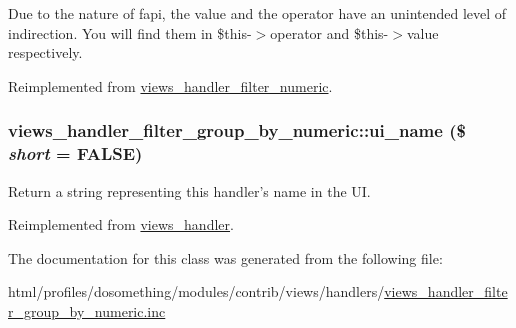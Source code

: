 Due to the nature of fapi, the value and the operator have an unintended level of indirection. You will find them in \$this-\/$>$operator and \$this-\/$>$value respectively. 

Reimplemented from \hyperlink{classviews__handler__filter__numeric_aaa5c6b227651bd1676850f5999f2a897}{views\_\-handler\_\-filter\_\-numeric}.\hypertarget{classviews__handler__filter__group__by__numeric_a0b932b97100b4c0a365e710caf747b97}{
\subsubsection[{ui\_\-name}]{\setlength{\rightskip}{0pt plus 5cm}views\_\-handler\_\-filter\_\-group\_\-by\_\-numeric::ui\_\-name (\$ {\em short} = {\ttfamily FALSE})}}
\label{classviews__handler__filter__group__by__numeric_a0b932b97100b4c0a365e710caf747b97}
Return a string representing this handler's name in the UI. 

Reimplemented from \hyperlink{classviews__handler_ae81019ed08d9c3f5bca3d16c69e7b39f}{views\_\-handler}.

The documentation for this class was generated from the following file:\begin{DoxyCompactItemize}
\item 
html/profiles/dosomething/modules/contrib/views/handlers/\hyperlink{views__handler__filter__group__by__numeric_8inc}{views\_\-handler\_\-filter\_\-group\_\-by\_\-numeric.inc}\end{DoxyCompactItemize}
